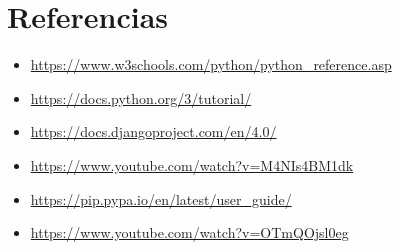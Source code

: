 \documentclass{article}
\begin{document}
\section{Referencias}
\begin{itemize}	
    \item \url{https://www.w3schools.com/python/python_reference.asp}
    \item \url{ https://docs.python.org/3/tutorial/}
    \item \url{https://docs.djangoproject.com/en/4.0/}
    \item \url{https://www.youtube.com/watch?v=M4NIs4BM1dk}
    \item \url{https://pip.pypa.io/en/latest/user_guide/}
    \item \url{https://www.youtube.com/watch?v=OTmQOjsl0eg}
\end{itemize}	
	
%
%
%
			
\end{document}
